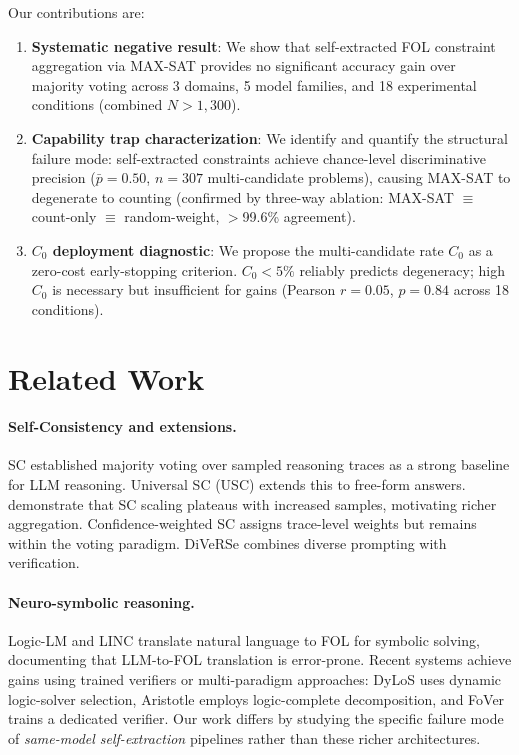 \documentclass[11pt,a4paper]{article}
\begin{document}
Our contributions are:
\begin{enumerate}
    \item \textbf{Systematic negative result}: We show that self-extracted FOL constraint aggregation via MAX-SAT provides no significant accuracy gain over majority voting across 3 domains, 5 model families, and 18 experimental conditions (combined $N{>}1{,}300$).
    \item \textbf{Capability trap characterization}: We identify and quantify the structural failure mode: self-extracted constraints achieve chance-level discriminative precision ($\bar{p}=0.50$, $n=307$ multi-candidate problems), causing MAX-SAT to degenerate to counting (confirmed by three-way ablation: MAX-SAT $\equiv$ count-only $\equiv$ random-weight, $>$99.6\% agreement).
    \item \textbf{$C_0$ deployment diagnostic}: We propose the multi-candidate rate $C_0$ as a zero-cost early-stopping criterion. $C_0{<}5\%$ reliably predicts degeneracy; high $C_0$ is necessary but insufficient for gains (Pearson $r=0.05$, $p=0.84$ across 18 conditions).
\end{enumerate}

\section{Related Work}
\label{sec:related}

\paragraph{Self-Consistency and extensions.}
SC \citep{wang2023selfconsistency} established majority voting over sampled reasoning traces as a strong baseline for LLM reasoning.
Universal SC (USC) \citep{chen2023usc} extends this to free-form answers.
\citet{loo2025sc} demonstrate that SC scaling plateaus with increased samples, motivating richer aggregation.
Confidence-weighted SC \citep{taubenfeld2025weighted} assigns trace-level weights but remains within the voting paradigm.
DiVeRSe \citep{li2023diverse} combines diverse prompting with verification.

\paragraph{Neuro-symbolic reasoning.}
Logic-LM \citep{pan2023logiclm} and LINC \citep{olausson2023linc} translate natural language to FOL for symbolic solving, documenting that LLM-to-FOL translation is error-prone.
Recent systems achieve gains using trained verifiers or multi-paradigm approaches: DyLoS \citep{dylos2026} uses dynamic logic-solver selection, Aristotle \citep{aristotle2025} employs logic-complete decomposition, and FoVer \citep{fover2025} trains a dedicated verifier.
Our work differs by studying the specific failure mode of \emph{same-model self-extraction} pipelines rather than these richer architectures.
\end{document}
